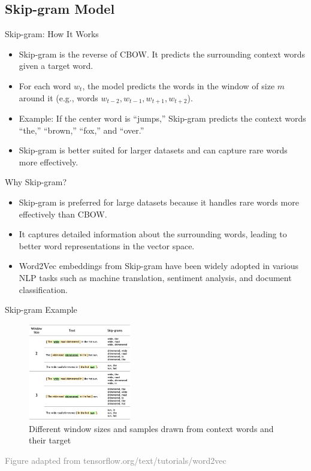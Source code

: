\documentclass[serif, aspectratio=169]{beamer}
\begin{document}
\subsection{Skip-gram Model}

\begin{frame}{Skip-gram: How It Works}
    \begin{itemize}
        \item Skip-gram is the reverse of CBOW. It predicts the surrounding context words given a target word.
        \item For each word \(w_t\), the model predicts the words in the window of size \(m\) around it (e.g., words \(w_{t-2}, w_{t-1}, w_{t+1}, w_{t+2}\)).
        \item Example: If the center word is “jumps,” Skip-gram predicts the context words “the,” “brown,” “fox,” and “over.”
        \item Skip-gram is better suited for larger datasets and can capture rare words more effectively.
    \end{itemize}
\end{frame}

\begin{frame}{Why Skip-gram?}
	\begin{itemize}
		\item Skip-gram is preferred for large datasets because it handles rare words more effectively than CBOW.
		\item It captures detailed information about the surrounding words, leading to better word representations in the vector space.
		\item Word2Vec embeddings from Skip-gram have been widely adopted in various NLP tasks such as machine translation, sentiment analysis, and document classification.
	\end{itemize}
\end{frame}


\begin{frame}{Skip-gram Example}
    \begin{figure}
        \centering
        \includegraphics[width=0.4\textwidth]{pic/10.png}
        \caption*{Different window sizes and samples drawn from context words and their target}
    \end{figure}
    \vspace{0.1cm}
    \hspace{-1.0cm}
    {\tiny \textcolor{gray}{Figure adapted from tensorflow.org/text/tutorials/word2vec}}
\end{frame}
\end{document}
